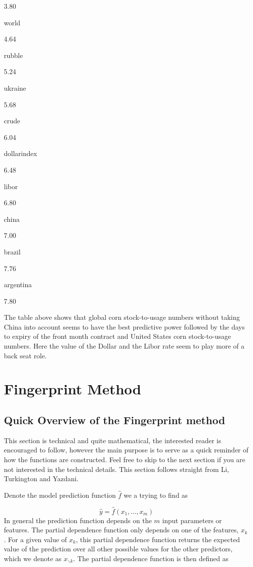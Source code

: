 \documentclass[
]{book}
\begin{document}
3.80

world

4.64

rubble

5.24

ukraine

5.68

crude

6.04

dollarindex

6.48

libor

6.80

china

7.00

brazil

7.76

argentina

7.80

The table above shows that global corn stock-to-usage numbers without taking China into account seems to have the best predictive power followed by the days to expiry of the front month contract and United States corn stock-to-usage numbers. Here the value of the Dollar and the Libor rate seem to play more of a back seat role.

\hypertarget{fingerprint-method}{%
\chapter{Fingerprint Method}\label{fingerprint-method}}

\hypertarget{quick-overview-of-the-fingerprint-method}{%
\section{Quick Overview of the Fingerprint method}\label{quick-overview-of-the-fingerprint-method}}

This section is technical and quite mathematical, the interested reader is encouraged to follow, however the main purpose is to serve as a quick reminder of how the functions are constructed. Feel free to skip to the next section if you are not interested in the technical details. This section follows straight from Li, Turkington and Yazdani.

Denote the model prediction function \(\hat{f}\) we a trying to find as

\[
\hat{y} = \hat{f}(x_1, \dots, x_m)
\]
In general the prediction function depends on the \(m\) input parameters or features. The partial dependence function only depends on one of the features, \(x_k\). For a given value of \(x_k\), this partial dependence function returns the expected value of the prediction over all other possible values for the other predictors, which we denote as \(x_{\backslash k}\). The partial dependence function is then defined as
\end{document}
